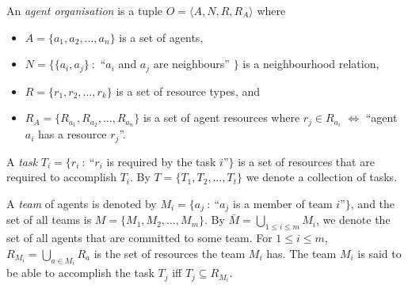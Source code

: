 \documentclass{llncs}
\begin{document}
\begin{definition}
An \emph{agent organisation} is a tuple $O=\langle A, N, R, R_A  \rangle$ where
\noindent
\begin{itemize}
\item $A= \{ a_1,a_2,...,a_n \} $ is a set of agents,
\item $N=\{\{a_i,a_j \}\ :$ ``$a_i$ and $a_j$ are neighbours'' $\}$ is a neighbourhood relation,
\item $R=\{r_1,r_2,\dots,r_k\}$ is a set of resource types, and
\item $R_A=\{R_{a_1}, R_{a_2}, \dots, R_{a_n}\}$ is a set of agent resources where $r_j \in R_{a_i} $ $\iff$ ``agent $a_i$ has a resource $r_j$''.
\end{itemize}
\end{definition}

\begin{definition}[Task]
A \emph{task} $T_i=\{r_i\ :\ $``$r_i$ is required by the task $i$''$\}$ is a set of resources that are required to accomplish $T_i$. By $T=\{T_1, T_2,\dots, T_t\}$ we denote a collection of tasks.
\end{definition}

\begin{definition}[Team]
A \emph{team} of agents is denoted by $M_i=\{a_j\ :\ $``$a_j$ is a member of team $i$''$\}$, and the set of all teams is $M=\{M_1, M_2,\dots , M_m\}$. By $\bar{M} = \bigcup_{1\leq i\leq m} M_i$, we denote the set of all agents that are committed to some team. For $1\leq i\leq m$, $R_{M_i}=\bigcup_{a \in M_i}R_{a}$ is the set of resources the team $M_i$ has. The team $M_i$ is said to be able to accomplish the task $T_j$ iff $T_j \subseteq R_{M_i}$.
\end{definition}
\end{document}
